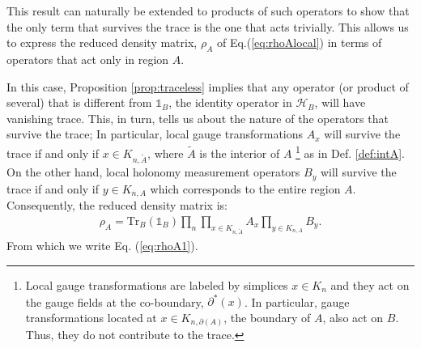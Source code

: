 \documentclass[%
nofootinbib,
 amsmath,amssymb,
aps,
]{revtex4-1}
\theoremstyle{plain}%
\theoremstyle{definition}
\theoremstyle{remark}
\begin{document}
 This result can naturally be extended to products of such operators to show that the only term that survives the trace is the one that acts trivially. This allows us to express  the reduced density matrix, \(\rho_A\) of Eq.(\ref{eq:rhoAlocal}) in terms of operators that act only in region \(A\). 
 
 In this case,  Proposition \ref{prop:traceless} implies that any operator (or product of several) that is different from \(\mathbb{1}_B\), the identity operator in \(\mathcal{H}_B\), will have vanishing trace. This, in turn, tells us about the nature of the operators that survive the trace; In particular, local gauge transformations \(A_{x}\) will survive the trace if and only if \(x \in K_{n,\tilde{A}}\), where \(\tilde{A}\) is the interior of \(A\) \footnote{Local gauge transformations are labeled by simplices \(x \in K_n\) and they act on the gauge fields at the co-boundary, \(\partial^{\ast}(x)\). In particular, gauge transformations located at \(x \in K_{n,{\partial(A)}}\), the boundary of \(A\), also act on \(B\). Thus, they do not contribute to the trace.} as in Def. \ref{def:intA}. On the other hand, local holonomy measurement operators \(B_{y}\) will survive the trace if and only if \(y \in K_{n,A}\) which corresponds to the entire region $A$. Consequently, the reduced density matrix is:
\begin{align*}
\rho_A =\text{Tr}_B(\mathbb{1}_B) \prod_{n} \prod_{x \in K_{n,\tilde{A}}}A_{x}\prod_{y \in K_{n,A}}B_{y} .
\end{align*}  
From which we write Eq. (\ref{eq:rhoA1}).



\end{document}
